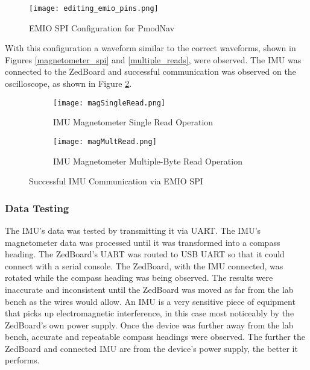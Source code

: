 \begin{figure}[H]
	\centerline{\texttt{[image: editing\_emio\_pins.png]}}
	\caption{EMIO SPI Configuration for PmodNav}
	\label{emio_config}
\end{figure}

With this configuration a waveform similar to the correct waveforms, shown in Figures \ref{magnetometer_spi} and \ref{multiple_reads}, were observed. The IMU was connected to the ZedBoard and successful communication was observed on the oscilloscope, as shown in Figure \ref{OTPHJ}.

\begin{figure}[H] 
	\begin{subfigure}{1\textwidth}
	\centering
		\texttt{[image: magSingleRead.png]}
		\caption{IMU Magnetometer Single Read Operation}
	\end{subfigure}
	\begin{subfigure}{1\textwidth}
	\centering
		\texttt{[image: magMultRead.png]}
		\caption{IMU Magnetometer Multiple-Byte Read Operation}
	\end{subfigure}
	\caption{Successful IMU Communication via EMIO SPI}
	\label{OTPHJ}
\end{figure}

\subsubsection{Data Testing}
The IMU's data was tested by transmitting it via UART. The IMU's magnetometer data was processed until it was transformed into a compass heading. The ZedBoard's UART was routed to USB UART so that it could connect with a serial console. The ZedBoard, with the IMU connected, was rotated while the compass heading was being observed. The results were inaccurate and inconsistent until the ZedBoard was moved as far from the lab bench as the wires would allow. An IMU is a very sensitive piece of equipment that picks up electromagnetic interference, in this case most noticeably by the ZedBoard's own power supply. Once the device was further away from the lab bench, accurate and repeatable compass headings were observed. The further the ZedBoard and connected IMU are from the device's power supply, the better it performs.




